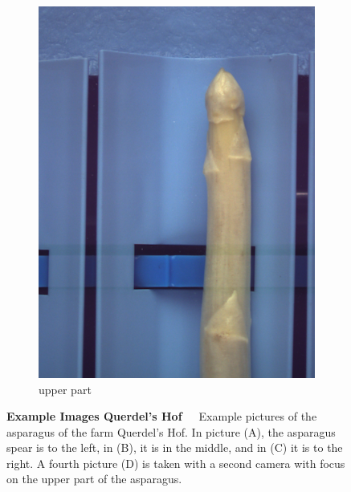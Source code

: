 \begin{figure}[h]
	\begin{subfigure}{0.3\textwidth}
		\vspace{10pt}
		\includegraphics[width=0.9\linewidth]{Figures/chapter02/querdel_d.png}
		\caption{upper part}
	\end{subfigure}
    \caption[Example Asparagus Images Querdel's Hof]{\textbf{Example Images Querdel's Hof}~~~Example pictures of the asparagus of the farm Querdel's Hof. In picture (A), the asparagus spear is to the left, in (B), it is in the middle, and in (C) it is to the right. A fourth picture (D) is taken with a second camera with focus on the upper part of the asparagus.}
    \label{fig:ExampleImagesQuerdel}
\end{figure}

